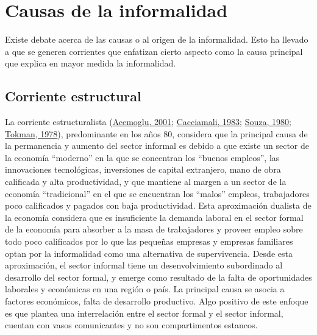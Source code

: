 \documentclass[
  letterpaper,
  12pt,
  oneside,
  spanish,
  doublespacing,
  headsepline,
  parskip]{MastersDoctoralThesis}
\begin{document}
\hypertarget{causas-de-la-informalidad}{%
\section{Causas de la informalidad}\label{causas-de-la-informalidad}}

Existe debate acerca de las causas o al origen de la informalidad. Esto
ha llevado a que se generen corrientes que enfatizan cierto aspecto como
la causa principal que explica en mayor medida la informalidad.

\hypertarget{corriente-estructural}{%
\subsection{Corriente estructural}\label{corriente-estructural}}

La corriente estructuralista
(\protect\hyperlink{ref-acemoglu2001}{Acemoglu, 2001};
\protect\hyperlink{ref-cacciamali1983}{Cacciamali, 1983};
\protect\hyperlink{ref-souza1980}{Souza, 1980};
\protect\hyperlink{ref-tokman1978}{Tokman, 1978}), predominante en los
años 80, considera que la principal causa de la permanencia y aumento
del sector informal es debido a que existe un sector de la economía
``moderno'' en la que se concentran los ``buenos empleos'', las
innovaciones tecnológicas, inversiones de capital extranjero, mano de
obra calificada y alta productividad, y que mantiene al margen a un
sector de la economía ``tradicional'' en el que se encuentran los
``malos'' empleos, trabajadores poco calificados y pagados con baja
productividad. Esta aproximación dualista de la economía considera que
es insuficiente la demanda laboral en el sector formal de la economía
para absorber a la masa de trabajadores y proveer empleo sobre todo poco
calificados por lo que las pequeñas empresas y empresas familiares optan
por la informalidad como una alternativa de supervivencia. Desde esta
aproximación, el sector informal tiene un desenvolvimiento subordinado
al desarrollo del sector formal, y emerge como resultado de la falta de
oportunidades laborales y económicas en una región o país. La principal
causa se asocia a factores económicos, falta de desarrollo productivo.
Algo positivo de este enfoque es que plantea una interrelación entre el
sector formal y el sector informal, cuentan con vasos comunicantes y no
son compartimentos estancos.
\end{document}
